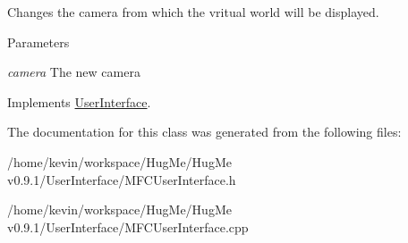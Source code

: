 Changes the camera from which the vritual world will be displayed. 


\begin{DoxyParams}{Parameters}
\item[{\em camera}]The new camera \end{DoxyParams}


Implements \hyperlink{classUserInterface_ac43bf70dfea5b28e4cc185a0a72334c3}{UserInterface}.



The documentation for this class was generated from the following files:\begin{DoxyCompactItemize}
\item 
/home/kevin/workspace/HugMe/HugMe v0.9.1/UserInterface/MFCUserInterface.h\item 
/home/kevin/workspace/HugMe/HugMe v0.9.1/UserInterface/MFCUserInterface.cpp\end{DoxyCompactItemize}
